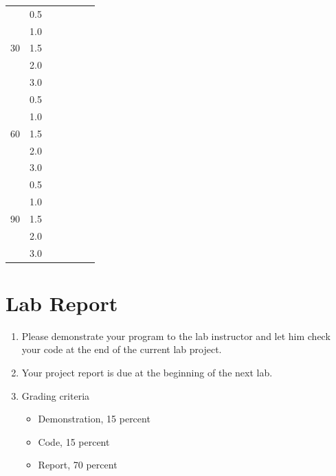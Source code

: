 \documentclass[letterpaper,12pt]{article}
\begin{document}
\begin{enumerate}
\begin{table}[H]
\begin{center}
\begin{tabular}{|c|c|c|c|c|c|c|}
                \multirow{5}{*}{30} & 0.5 & & & & \\ \cline{2-7}
                & 1.0 & & & & \\ \cline{2-7}
                & 1.5 & & & & \\ \cline{2-7}
                & 2.0 & & & & \\ \cline{2-7}
                & 3.0 & & & & \\ \hline
                \multirow{5}{*}{60} & 0.5 & & & & \\ \cline{2-7}
                & 1.0 & & & & \\ \cline{2-7}
                & 1.5 & & & & \\ \cline{2-7}
                & 2.0 & & & & \\ \cline{2-7}
                & 3.0 & & & & \\ \hline
                \multirow{5}{*}{90} & 0.5 & & & & \\ \cline{2-7}
                & 1.0 & & & & \\ \cline{2-7}
                & 1.5 & & & & \\ \cline{2-7}
                & 2.0 & & & & \\ \cline{2-7}
                & 3.0 & & & & \\ \hline
            \end{tabular}
        \end{center}
        \end{table}
\end{enumerate}
\section*{Lab Report}
\begin{enumerate}
   \item Please demonstrate your program to the lab instructor and let him check your code at the end of the current lab project.
   \item Your project report is due at the beginning of the next lab.
   \item Grading criteria
      \begin{itemize}
         \item Demonstration, 15 percent
         \item Code, 15 percent
         \item Report, 70 percent
      \end{itemize}
\end{enumerate}
\end{document}
